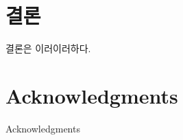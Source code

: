 \documentclass[onecolumn,showpacs,preprintnumbers,amsmath,amssymb,superscriptaddress,preprint]{revtex4-1}
\def\PREP{Phys. Rep.}
\def\Journal#1#2#3#4{{#1} {\bf #2} (#3) #4}
\def\PRL{Phys. Rev. Lett.}
\begin{document}
\section{결론}

결론은 이러이러하다.

\section*{Acknowledgments}
Acknowledgments




\end{document}
